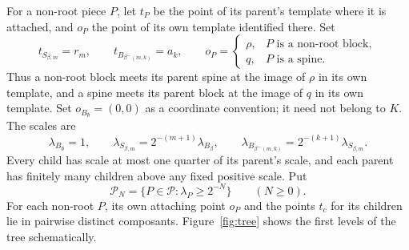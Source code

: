 \documentclass[11pt]{amsart}
\theoremstyle{definition}
\theoremstyle{remark}
\newcommand{\Pc}{\mathcal{P}}
\begin{document}
For a non-root piece $P$, let $t_P$ be the point of its parent's template where it is attached, and $o_P$ the point of its own template identified there. Set
\[
t_{S_{\beta,m}}=r_m,\qquad t_{B_{\beta^\frown(m,k)}}=a_k,\qquad
o_P=\begin{cases}\rho,&P\text{ is a non-root block},\\ q,&P\text{ is a spine}.\end{cases}
\]
Thus a non-root block meets its parent spine at the image of $\rho$ in its own template, and a spine meets its parent block at the image of $q$ in its own template. Set $o_{B_\emptyset}=(0,0)$ as a coordinate convention; it need not belong to $K$. The scales are
\[
\lambda_{B_\emptyset}=1,\qquad \lambda_{S_{\beta,m}}=2^{-(m+1)}\lambda_{B_\beta},\qquad \lambda_{B_{\beta^\frown(m,k)}}=2^{-(k+1)}\lambda_{S_{\beta,m}}.
\]
Every child has scale at most one quarter of its parent's scale, and each parent has finitely many children above any fixed positive scale. Put
\[
\Pc_N=\{P\in\Pc:\lambda_P\ge2^{-N}\}\qquad(N\ge0).
\]
For each non-root $P$, its own attaching point $o_P$ and the points $t_c$ for its children lie in pairwise distinct composants. Figure~\ref{fig:tree} shows the first levels of the tree schematically.
\end{document}
